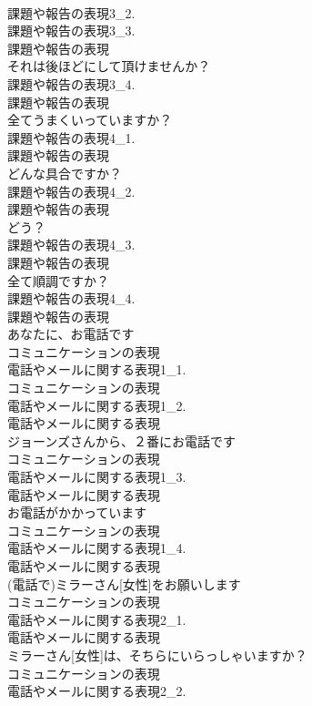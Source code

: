 \documentclass[8pt]{extreport}
\begin{document}
\begin{CJK}{UTF8}{min}
\\	課題や報告の表現3_2.
\\	課題や報告の表現3_3.
\\	課題や報告の表現
\\	それは後ほどにして頂けませんか？	
\\	課題や報告の表現3_4.
\\	課題や報告の表現
\\	全てうまくいっていますか？	
\\	課題や報告の表現4_1.
\\	課題や報告の表現
\\	どんな具合ですか？	
\\	課題や報告の表現4_2.
\\	課題や報告の表現
\\	どう？	
\\	課題や報告の表現4_3.
\\	課題や報告の表現
\\	全て順調ですか？	
\\	課題や報告の表現4_4.
\\	課題や報告の表現
\\	あなたに、お電話です	
\\	コミュニケーションの表現
\\	電話やメールに関する表現1_1.
\\	コミュニケーションの表現
\\	電話やメールに関する表現1_2.
\\	電話やメールに関する表現
\\	ジョーンズさんから、２番にお電話です	
\\	コミュニケーションの表現
\\	電話やメールに関する表現1_3.
\\	電話やメールに関する表現
\\	お電話がかかっています	
\\	コミュニケーションの表現
\\	電話やメールに関する表現1_4.
\\	電話やメールに関する表現
\\	(電話で)ミラーさん[女性]をお願いします	
\\	コミュニケーションの表現
\\	電話やメールに関する表現2_1.
\\	電話やメールに関する表現
\\	ミラーさん[女性]は、そちらにいらっしゃいますか？	
\\	コミュニケーションの表現
\\	電話やメールに関する表現2_2.

\end{CJK}
\end{document}
